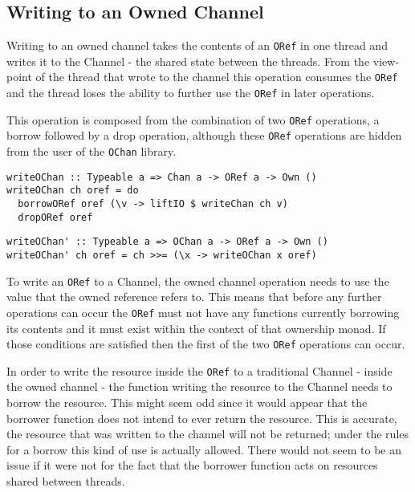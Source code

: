 \documentclass[onehalf,11pt]{beavtex}
\begin{document}
\subsection{Writing to an Owned Channel}

Writing to an owned channel takes the contents of an \texttt{ORef} in
one thread and writes it to the Channel - the shared state between the threads.
From the view-point of the thread that wrote to the channel this operation
consumes the \texttt{ORef} and the thread loses the ability to further use the
\texttt{ORef} in later operations.

This operation is composed from the combination of two
\texttt{ORef} operations, a borrow followed by a drop operation, 
although these \texttt{ORef} operations are hidden from the user of the
\texttt{OChan} library.

\begin{verbatim}
writeOChan :: Typeable a => Chan a -> ORef a -> Own ()
writeOChan ch oref = do
  borrowORef oref (\v -> liftIO $ writeChan ch v)
  dropORef oref
\end{verbatim}

\begin{verbatim}
writeOChan' :: Typeable a => OChan a -> ORef a -> Own ()
writeOChan' ch oref = ch >>= (\x -> writeOChan x oref)
\end{verbatim}

To write an \texttt{ORef} to a Channel, the owned channel operation
needs to use the value that the owned reference refers to.  This means
that before any further operations can occur the \texttt{ORef} must not have any
functions currently borrowing its contents and it must exist within the context
of that ownership monad.
If those conditions are satisfied then the first of the two \texttt{ORef}
operations can occur.

In order to write the resource inside the \texttt{ORef} to a traditional Channel
- inside the owned channel - the function writing the resource to the
Channel needs to borrow the resource.
This might seem odd since it would appear that the borrower function does not
intend to ever return the resource.  This is accurate, the resource that was
written to the channel will not be returned; under the rules for a
borrow this kind of use is actually allowed.
There would not seem to be an issue if it were not for the fact that
the borrower function acts on resources shared between threads.

\end{document}
